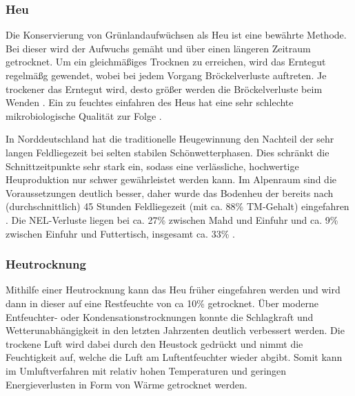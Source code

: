 
\subsubsection{Heu}
\label{subsub:Heu}
Die Konservierung von Grünlandaufwüchsen als Heu ist eine bewährte Methode.
Bei dieser wird der Aufwuchs gemäht und über einen längeren Zeitraum getrocknet.
Um ein gleichmäßiges Trocknen zu erreichen, wird das Erntegut regelmäßg gewendet, wobei bei jedem Vorgang Bröckelverluste auftreten.
Je trockener das Erntegut wird, desto größer werden die Bröckelverluste beim Wenden \parencite[12]{sauter2008brockelverluste}.
Ein zu feuchtes einfahren des Heus hat eine sehr schlechte mikrobiologische Qualität zur Folge \parencite[269]{besier2013heu}.

In Norddeutschland hat die traditionelle Heugewinnung den Nachteil der sehr langen Feldliegezeit bei selten stabilen Schönwetterphasen.
Dies schränkt die Schnittzeitpunkte sehr stark ein, sodass eine verlässliche, hochwertige Heuproduktion nur schwer gewährleistet werden kann.
Im Alpenraum sind die Voraussetzungen deutlich besser, daher wurde das Bodenheu der \HBLFA bereits nach (durchschnittlich) 45 Stunden Feldliegezeit (mit ca. 88\% \ac{TM}-Gehalt) eingefahren \parencite[63]{gruber2015einfluss}.
Die \ac{NEL}-Verluste liegen bei ca. 27\% zwischen Mahd und Einfuhr und ca. 9\% zwischen Einfuhr und Futtertisch, insgesamt ca. 33\% \parencite[30]{fritz2018wirtschaftliche}.

\subsubsection{Heutrocknung}
\label{subsub:Heutrocknung}
Mithilfe einer Heutrocknung kann das Heu früher eingefahren werden und wird dann in dieser auf eine Restfeuchte von ca 10\% getrocknet.
Über moderne Entfeuchter- oder Kondensationstrocknungen konnte die Schlagkraft und Wetterunabhängigkeit in den letzten Jahrzenten deutlich verbessert werden.
Die trockene Luft wird dabei durch den Heustock gedrückt und nimmt die Feuchtigkeit auf, welche die Luft am Luftentfeuchter wieder abgibt.
Somit kann im Umluftverfahren mit relativ hohen Temperaturen und geringen Energieverlusten in Form von Wärme getrocknet werden. 

